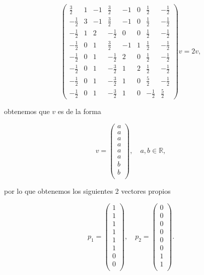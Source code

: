 \documentclass[letterpaper]{article}
\theoremstyle{definition}
\theoremstyle{lemathm}
\theoremstyle{lemademthm}
\newcommand{\pars}[1]{\left( #1 \right) }
\newcommand{\RR}{\mathbb{R}}
\newcommand{\1}{\mathbbm{1}}
\begin{document}
\begin{enumerate}
\begin{itemize}
			\[\pars{\begin{array}{cccccccc} \frac{3}{2} & 1 & -1 & \frac{3}{2} & -1 & 0 & \frac{1}{2} & -\frac{1}{2} \\[1ex] -\frac{1}{2} & 3 & -1 & \frac{3}{2} & -1 & 0 & \frac{1}{2} & -\frac{1}{2} \\[1ex] -\frac{1}{2} & 1 & 2 & -\frac{1}{2} & 0 & 0 & \frac{1}{2} & -\frac{1}{2} \\[1ex] -\frac{1}{2} & 0 & 1 & \frac{3}{2} & -1 & 1 & \frac{1}{2} & -\frac{1}{2} \\[1ex] -\frac{1}{2} & 0 & 1 & -\frac{1}{2} & 2 & 0 & \frac{1}{2} & -\frac{1}{2} \\[1ex] -\frac{1}{2} & 0 & 1 & -\frac{3}{2} & 1 & 2 & \frac{1}{2} & -\frac{1}{2} \\[1ex] -\frac{1}{2} & 0 & 1 & -\frac{3}{2} & 1 & 0 & \frac{5}{2} & -\frac{1}{2} \\[1ex] -\frac{1}{2} & 0 & 1 & -\frac{3}{2} & 1 & 0 & -\frac{1}{2} & \frac{5}{2} \end{array}} v = 2 v,\]

			obtenemos que $v$ es de la forma

			\[v = \pars{\begin{array}{c}
				a\\[1ex]
				a\\[1ex]
				a\\[1ex]
				a\\[1ex]
				a\\[1ex]
				a\\[1ex]
				b\\[1ex]
				b\\
			\end{array}}, \quad a,b\in\RR,\]

			por lo que obtenemos los siguientes 2 vectores propios

			\[p_1 = \pars{\begin{array}{c}
				1\\[1ex]
				1\\[1ex]
				1\\[1ex]
				1\\[1ex]
				1\\[1ex]
				1\\[1ex]
				0\\[1ex]
				0\\
			\end{array}}, \quad p_2 = \pars{\begin{array}{c}
				0\\[1ex]
				0\\[1ex]
				0\\[1ex]
				0\\[1ex]
				0\\[1ex]
				0\\[1ex]
				1\\[1ex]
				1\\
			\end{array}}.\]


\end{itemize}
\end{enumerate}
\end{document}
